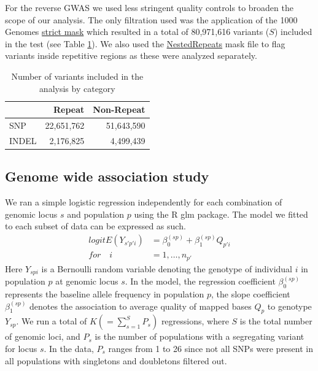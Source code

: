 \documentclass[9pt,lineno]{elife}
\begin{document}
For the reverse GWAS we used less stringent quality controls to broaden the scope of our analysis. The only filtration used was the application of the  1000 Genomes \href{http://ftp.1000genomes.ebi.ac.uk/vol1/ftp/release/20130502/supporting/accessible_genome_masks/20141020.strict_mask.whole_genome.bed}{strict mask} which resulted in a total of 80,971,616 variants ($S$) included in the test (see Table \ref{totTable}). We also used the \href{http://hgdownload.cse.ucsc.edu/goldenpath/hg19/database/nestedRepeats.txt.gz}{NestedRepeats} mask file to flag variants inside repetitive regions as these were analyzed separately.

\begin{table}[h]
\begin{tabular}{l  r r}
                      & {Repeat}  & {Non-Repeat}       \\ \hline
{SNP}  & 22,651,762 & 51,643,590  \\  
{INDEL} &  2,176,825  & 4,499,439 \\ \hline
\end{tabular}
\caption{Number of variants included in the analysis by category}
\label{totTable}
\end{table}

\subsection{Genome wide association study}
We ran a simple logistic regression independently for each combination of genomic locus $s$ and population $p$ using the R glm package\citep{RDevelopmentCoreTeam2016}. The model we fitted to each subset of data can be expressed as such.
\begin{align*}
{logit}{E(Y_{s'p'i})} &= \beta_{0}^{(sp)} + \beta_{1}^{(sp)} Q_{p'i}
\\
\textit{for}\quad i &= 1,\hdots, n_{p'}
\end{align*}
Here $Y_{spi}$ is a Bernoulli random variable denoting the genotype of individual $i$ in population $p$ at genomic locus $s$. 
In the model, the regression coefficient $\beta_{0}^{(sp)}$ represents the baseline allele frequency in population $p$, the slope coefficient $\beta_{1}^{(sp)}$ denotes the association to average quality of mapped bases $Q_{p}$ to genotype $Y_{sp}$. 
We run a total of $K (= \sum_{s=1}^S P_s)$ regressions, where $S$ is the total number of genomic loci, and $P_s$ is the number of populations with a segregating variant for locus $s$. 
In the data, $P_s$ ranges from 1 to 26 since not all SNPs were present in all populations with singletons and doubletons filtered out.
\end{document}
